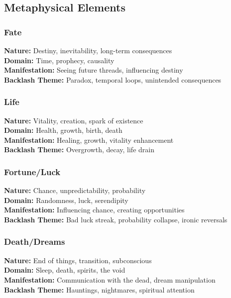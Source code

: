 \subsection{Metaphysical Elements}

\subsubsection{Fate}
\textbf{Nature:} Destiny, inevitability, long-term consequences\\
\textbf{Domain:} Time, prophecy, causality\\
\textbf{Manifestation:} Seeing future threads, influencing destiny\\
\textbf{Backlash Theme:} Paradox, temporal loops, unintended consequences

\subsubsection{Life}
\textbf{Nature:} Vitality, creation, spark of existence\\
\textbf{Domain:} Health, growth, birth, death\\
\textbf{Manifestation:} Healing, growth, vitality enhancement\\
\textbf{Backlash Theme:} Overgrowth, decay, life drain

\subsubsection{Fortune/Luck}
\textbf{Nature:} Chance, unpredictability, probability\\
\textbf{Domain:} Randomness, luck, serendipity\\
\textbf{Manifestation:} Influencing chance, creating opportunities\\
\textbf{Backlash Theme:} Bad luck streak, probability collapse, ironic reversals

\subsubsection{Death/Dreams}
\textbf{Nature:} End of things, transition, subconscious\\
\textbf{Domain:} Sleep, death, spirits, the void\\
\textbf{Manifestation:} Communication with the dead, dream manipulation\\
\textbf{Backlash Theme:} Hauntings, nightmares, spiritual attention

